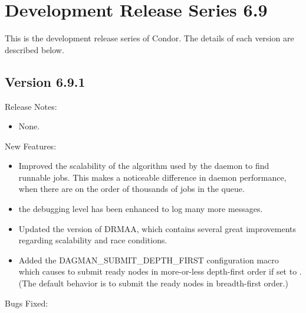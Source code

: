 \section{\label{sec:History-6-9}Development Release Series 6.9}

This is the development release series of Condor.
The details of each version are described below.

\subsection*{\label{sec:New-6-9-1}Version 6.9.1}

\noindent Release Notes:

\begin{itemize}

\item None.

\end{itemize}

\noindent New Features:

\begin{itemize}

\item Improved the scalability of the algorithm used by 
the  daemon to find runnable jobs.
This makes a noticeable difference in  daemon performance,
when there are on the order of thousands of jobs in the queue.

\item the  debugging level has been enhanced to
log many more messages. 

\item Updated the version of DRMAA, which contains several great
improvements regarding scalability and race conditions.

\item Added the DAGMAN\_SUBMIT\_DEPTH\_FIRST configuration macro which
causes  to submit ready nodes in more-or-less depth-first
order if set to .  (The default behavior is to submit
the ready nodes in breadth-first order.)

\end{itemize}

\noindent Bugs Fixed:

